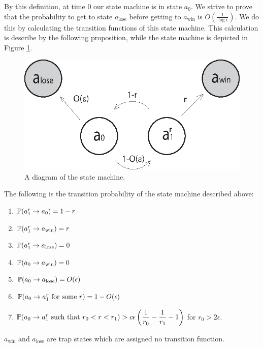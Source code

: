{{By this definition, at time $0$ our state machine is in state $a_0$.
We strive to prove that the probability to get to
 state $a_\text{lose}$ before getting to $a_\text{win}$ is $O(\frac1{\log\epsilon})$.
 We do this by calculating the transition functions of
 this state machine. This calculation is describe by the following proposition,
 while the state machine is depicted in Figure \ref{fig:state_machine}.

 \begin{figure}[htb]
\begin{center}
\leavevmode
\includegraphics{state_machine.eps}
\end{center}
\caption{A diagram of the state machine.}
\label{fig:state_machine}
\end{figure}

\begin{propos}\label{prop:trans}
The following is the transition probability of the state machine described above:
\begin{enumerate}
\item\label{m11} $\P(a^r_1\rightarrow a_0)=1-r$
\item\label{m12} $\P(a^r_1\rightarrow a_\text{win})=r$
\item\label{m13} $\P(a^r_1\rightarrow a_\text{lose})=0$
\item\label{m21} $\P(a_0\rightarrow a_\text{win})=0$
\item\label{m22} $\P(a_0\rightarrow a_\text{lose})=O(\epsilon)$
\item\label{m23} $\P(a_0\rightarrow a^r_1 \text{ for some }r)=1-O(\epsilon)$
\item\label{m24} $\P(a_0\rightarrow a^r_1 \text{ such that } r_0<r<r_1)>\ds c\epsilon\left(\frac 1 {r_0}-\frac 1 {r_1}-1\right)$ for $r_0>2\epsilon$.
\end{enumerate}
$a_\text{win}$ and $a_\text{lose}$ are trap states which are assigned no transition function.
\end{propos}

}}
